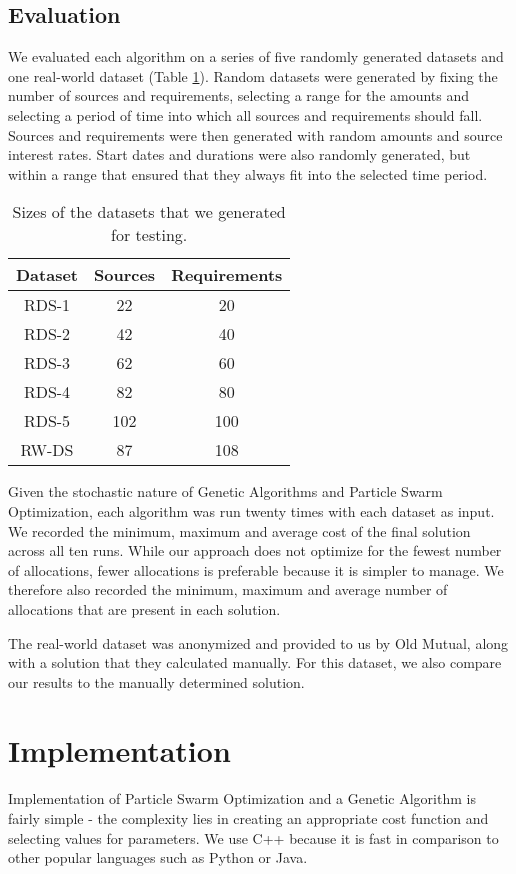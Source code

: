 \documentclass{sig-alternate}
\begin{document}
\subsection {Evaluation}
We evaluated each algorithm on a series of five randomly generated datasets and one real-world dataset (Table \ref{table:testdatasets}). Random datasets were generated by fixing the number of sources and requirements, selecting a range for the amounts and selecting a period of time into which all sources and requirements should fall.
Sources and requirements were then generated with random amounts and source interest rates. Start dates and durations were also randomly generated, but within a range that ensured that they always fit into the selected time period.

\begin{table}
	\centering
	\begin{tabular}{ | c | c | c | }
		\hline
		Dataset & Sources & Requirements \\ \hline
		RDS-1 & 22  & 20  \\ \hline
		RDS-2 & 42  & 40  \\ \hline
		RDS-3 & 62  & 60  \\ \hline
		RDS-4 & 82  & 80  \\ \hline
		RDS-5 & 102 & 100 \\ \hline
		RW-DS & 87  & 108 \\ \hline
	\end{tabular}
	\caption{Sizes of the datasets that we generated for testing.}
	\label{table:testdatasets}
\end{table}

Given the stochastic nature of Genetic Algorithms and Particle Swarm Optimization, each algorithm was run twenty times with each dataset as input. We recorded the minimum, maximum and average cost of the final solution across all ten runs. While our approach does not optimize for the fewest number of allocations, fewer allocations is preferable because it is simpler to manage. We therefore also recorded the minimum, maximum and average number of allocations that are present in each solution.

The real-world dataset was anonymized and provided to us by Old Mutual, along with a solution that they calculated manually. For this dataset, we also compare our results to the manually determined solution.

\section{Implementation}\label{sec:implementation}
Implementation of Particle Swarm Optimization and a Genetic Algorithm is fairly simple - the complexity lies in creating an appropriate cost function and selecting values for parameters. We use C++ because it is fast in comparison to other popular languages such as Python or Java.
\end{document}
